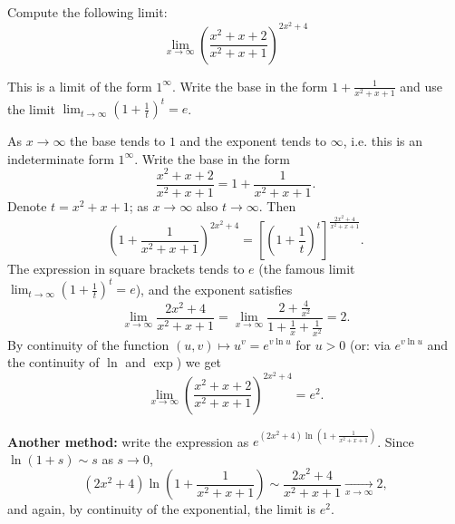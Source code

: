 
\begin{question}
Compute the following limit:
\[ \lim_{x\to\infty}\left(\frac{x^2+x+2}{x^2+x+1}\right)^{2x^2+4} \]
\end{question}

\begin{hint}
This is a limit of the form $1^\infty$. Write the base in the form $1+\frac{1}{x^2+x+1}$ and use the limit $\lim_{t\to\infty}\left(1+\frac1t\right)^t=e$.
\end{hint}

\begin{solution}
As $x\to\infty$ the base tends to $1$ and the exponent tends to $\infty$, i.e. this is an indeterminate form $1^\infty$.
Write the base in the form
\[ \frac{x^2+x+2}{x^2+x+1} = 1+\frac{1}{x^2+x+1}. \]
Denote $t=x^2+x+1$; as $x\to\infty$ also $t\to\infty$. Then
\[ \left(1+\frac{1}{x^2+x+1}\right)^{2x^2+4} = \left[\left(1+\frac1t\right)^{t}\right]^{\frac{2x^2+4}{x^2+x+1}}. \]
The expression in square brackets tends to $e$ (the famous limit $\lim_{t\to\infty}(1+\frac1t)^t=e$), and the exponent satisfies
\[ \lim_{x\to\infty}\frac{2x^2+4}{x^2+x+1} = \lim_{x\to\infty}\frac{2+\frac{4}{x^2}}{1+\frac1x+\frac1{x^2}} = 2. \]
By continuity of the function $(u,v)\mapsto u^v=e^{v\ln u}$ for $u>0$ (or: via $e^{v\ln u}$ and the continuity of $\ln$ and $\exp$) we get
\[ \lim_{x\to\infty}\left(\frac{x^2+x+2}{x^2+x+1}\right)^{2x^2+4} = e^{2}. \]

\textbf{Another method:} write the expression as $e^{(2x^2+4)\ln\left(1+\frac{1}{x^2+x+1}\right)}$. Since $\ln(1+s)\sim s$ as $s\to0$,
\[ (2x^2+4)\ln\left(1+\frac{1}{x^2+x+1}\right) \sim \frac{2x^2+4}{x^2+x+1}\xrightarrow[x\to\infty]{}2, \]
and again, by continuity of the exponential, the limit is $\boxed{e^2}$.
\end{solution}
